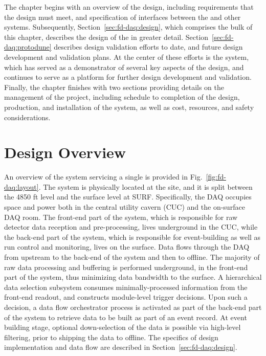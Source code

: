 The chapter begins with an overview of the  design,
including requirements that the design must meet, and specification of
interfaces between the   and other   systems. 
Subsequently, Section~\ref{sec:fd-daq:design}, which comprises the
bulk of this chapter, describes the design of the 
 in greater detail.
Section~\ref{sec:fd-daq:protodune} describes design validation efforts
to date, and future design development and validation plans. At the
center of these efforts is the 
  system, which has served as a demonstrator of several
key aspects of the      design, and continues to serve as a
platform for further design development and validation. 
Finally, the chapter finishes with two sections providing details on
the management of the
 project, including schedule to completion of the design, 
production, and installation of the system, as well as cost, resources, and
safety considerations.

\section{Design Overview}
\label{sec:fd-daq:overview}

An overview of the    system 
servicing a single 
 is
provided in Fig.~\ref{fig:fd-daq:layout}. The system is
physically located at the  site, and it is split between the
4850 ft level and the surface level at SURF. Specifically, the DAQ occupies space and
power both in the central utility cavern (CUC) and the on-surface DAQ
room.  The front-end part of the system, which is responsible for
raw detector data reception and pre-processing, lives
underground in the CUC, while the back-end part of the system, which is responsible for
event-building as well as run control and monitoring, lives on the
surface. Data flows through the DAQ from 
upstream to the back-end of the system and then to offline. The majority
of raw data processing and buffering is performed underground, in the
front-end part of the system, thus minimizing data bandwidth to the surface. A
hierarchical data selection subsystem consumes minimally-processed
information from the front-end readout, and
constructs module-level trigger decisions. Upon such a decision, a data
flow orchestrator process is activated as part of the back-end part of
the system
to retrieve data to be built as part of an event record. At event
building stage, optional down-selection of the data is possible via
high-level filtering, prior to shipping the data to offline.  The
specifics of design implementation and data flow are described in Section~\ref{sec:fd-daq:design}.

